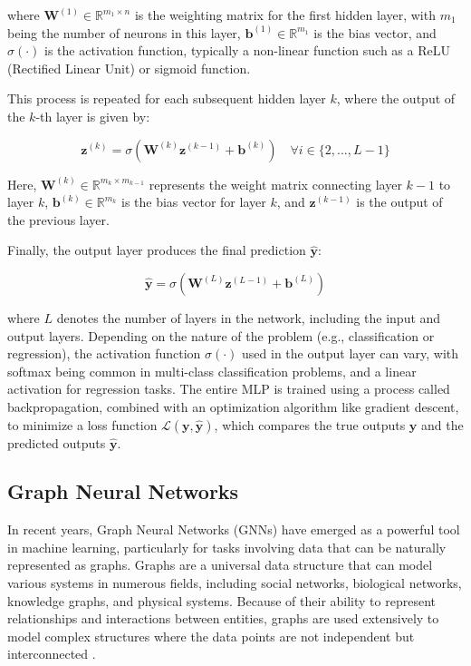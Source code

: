 \noindent where $\mathbf{W}^{(1)} \in \mathbb{R}^{m_1 \times n}$ is the weighting matrix for the first hidden layer, with $m_1$ being the number of neurons in this layer, $\mathbf{b}^{(1)} \in \mathbb{R}^{m_1}$ is the bias vector, and $\sigma(\cdot)$ is the activation function, typically a non-linear function such as a ReLU (Rectified Linear Unit) or sigmoid function.

This process is repeated for each subsequent hidden layer $k$, where the output of the $k$-th layer is given by:

\begin{equation}
 \mathbf{z}^{(k)} = \sigma\left(\mathbf{W}^{(k)}\mathbf{z}^{(k-1)} + \mathbf{b}^{(k)}\right) \quad \forall i \in \{ 2, ..., L-1 \} 
    \label{eq:hidden_layers_output}
\end{equation}


Here, $\mathbf{W}^{(k)} \in \mathbb{R}^{m_k \times m_{k-1}}$ represents the weight matrix connecting layer $k-1$ to layer $k$, $\mathbf{b}^{(k)} \in \mathbb{R}^{m_k}$ is the bias vector for layer $k$, and $\mathbf{z}^{(k-1)}$ is the output of the previous layer.

Finally, the output layer produces the final prediction $\mathbf{\hat{y}}$:

\begin{equation}
    \mathbf{\hat{y}} = \sigma\left(\mathbf{W}^{(L)}\mathbf{z}^{(L-1)} + \mathbf{b}^{(L)}\right) 
    \label{eq:output_layer}
\end{equation}

\noindent where $L$ denotes the number of layers in the network, including the input and output layers. Depending on the nature of the problem (e.g., classification or regression), the activation function $\sigma(\cdot)$ used in the output layer can vary, with softmax being common in multi-class classification problems, and a linear activation for regression tasks. The entire MLP is trained using a process called backpropagation, combined with an optimization algorithm like gradient descent, to minimize a loss function $\mathcal{L}(\mathbf{y}, \mathbf{\hat{y}})$, which compares the true outputs $\mathbf{y}$ and the predicted outputs $\mathbf{\hat{y}}$. 


\subsection{Graph Neural Networks}

In recent years, Graph Neural Networks (GNNs) have emerged as a powerful tool in machine learning, particularly for tasks involving data that can be naturally represented as graphs. Graphs are a universal data structure that can model various systems in numerous fields, including social networks, biological networks, knowledge graphs, and physical systems. Because of their ability to represent relationships and interactions between entities, graphs are used extensively to model complex structures where the data points are not independent but interconnected \cite{Jia_Wang_Shou_Hosseini_Bai_2023}.

